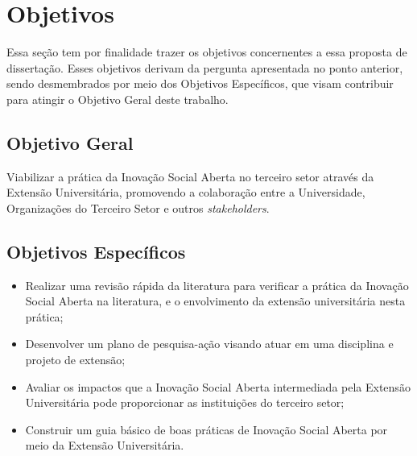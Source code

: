 \section{Objetivos}
\label{objetivos}

Essa seção tem por finalidade trazer os objetivos concernentes a essa proposta de dissertação. Esses objetivos derivam da pergunta apresentada no ponto anterior, sendo desmembrados por meio dos Objetivos Específicos, que visam contribuir para atingir o Objetivo Geral deste trabalho.

\subsection{\textbf{Objetivo Geral}}
Viabilizar a prática da Inovação Social Aberta no terceiro setor através da Extensão Universitária, promovendo a colaboração entre a Universidade, Organizações do Terceiro Setor e outros \textit{stakeholders}.

\subsection{\textbf{Objetivos Específicos}}
\begin{itemize}
    \item Realizar uma revisão rápida da literatura para verificar a prática da Inovação Social Aberta na literatura, e o envolvimento da extensão universitária nesta prática;
    \item Desenvolver um plano de pesquisa-ação visando atuar em uma disciplina e projeto de extensão; 
    \item Avaliar os impactos que a Inovação Social Aberta intermediada pela Extensão Universitária pode proporcionar as instituições do terceiro setor;
    \item Construir um guia básico de boas práticas de Inovação Social Aberta por meio da Extensão Universitária.
\end{itemize}
